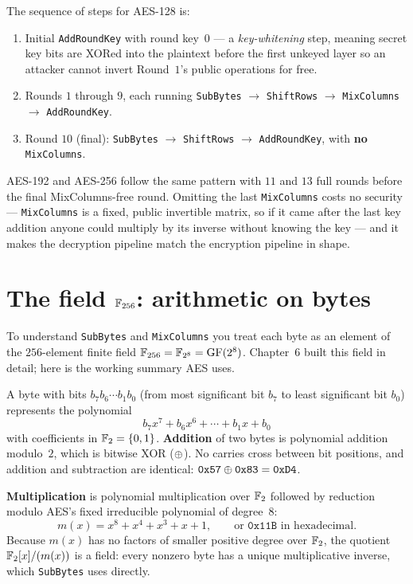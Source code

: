 The sequence of steps for AES-128 is:

\begin{enumerate}
\item Initial \texttt{AddRoundKey} with round key~$0$ --- a \emph{key-whitening}
step, meaning secret key bits are XORed into the plaintext before the first
unkeyed layer so an attacker cannot invert Round~$1$'s public operations for free.
\item Rounds $1$ through $9$, each running \texttt{SubBytes} $\to$
\texttt{ShiftRows} $\to$ \texttt{MixColumns} $\to$ \texttt{AddRoundKey}.
\item Round $10$ (final): \texttt{SubBytes} $\to$ \texttt{ShiftRows} $\to$
\texttt{AddRoundKey}, with \textbf{no} \texttt{MixColumns}.
\end{enumerate}

AES-192 and AES-256 follow the same pattern with $11$ and $13$ full rounds before
the final MixColumns-free round. Omitting the last \texttt{MixColumns} costs no
security --- \texttt{MixColumns} is a fixed, public invertible matrix, so if it came
after the last key addition anyone could multiply by its inverse without knowing
the key --- and it makes the decryption pipeline match the encryption pipeline in
shape.

\section{The field $\mathbb{F}_{256}$: arithmetic on bytes}
\label{ch12:field}

To understand \texttt{SubBytes} and \texttt{MixColumns} you treat each byte as an
element of the $256$-element finite field $\mathbb{F}_{256} = \mathbb{F}_{2^8} = \mathrm{GF}(2^8)$.
Chapter~6 built this field in detail; here is the working summary AES uses.

A byte with bits $b_7 b_6 \cdots b_1 b_0$ (from most significant bit $b_7$ to
least significant bit $b_0$) represents the polynomial
\[
b_7 x^7 + b_6 x^6 + \cdots + b_1 x + b_0
\]
with coefficients in $\mathbb{F}_2 = \{0,1\}$. \textbf{Addition} of two bytes is
polynomial addition modulo~$2$, which is bitwise XOR ($\oplus$). No carries cross
between bit positions, and addition and subtraction are identical:
$\mathtt{0x57} \oplus \mathtt{0x83} = \mathtt{0xD4}$.

\textbf{Multiplication} is polynomial multiplication over $\mathbb{F}_2$ followed by
reduction modulo AES's fixed irreducible polynomial of degree~$8$:
\[
m(x) = x^8 + x^4 + x^3 + x + 1, \qquad \text{or } \mathtt{0x11B} \text{ in hexadecimal.}
\]
Because $m(x)$ has no factors of smaller positive degree over $\mathbb{F}_2$, the
quotient $\mathbb{F}_2[x]/(m(x))$ is a field: every nonzero byte has a unique
multiplicative inverse, which \texttt{SubBytes} uses directly.

